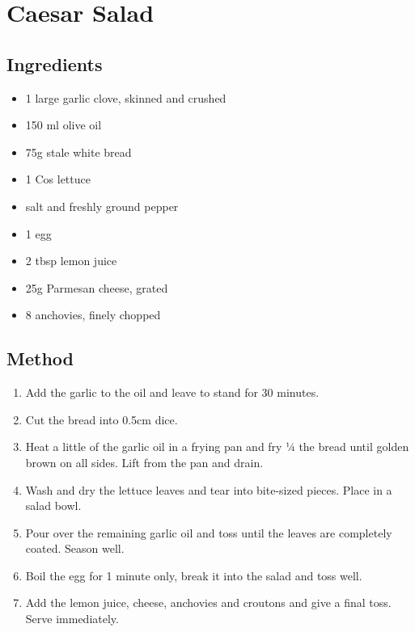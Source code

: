 \section{Caesar Salad}

  
\subsection{Ingredients}

\begin{itemize}
	\item 1 large garlic clove, skinned and crushed
	\item 150 ml olive oil
	\item 75g stale white bread
	\item 1 Cos lettuce
	\item salt and freshly ground pepper
	\item 1 egg
	\item 2 tbsp lemon juice
	\item 25g Parmesan cheese, grated
	\item 8 anchovies, finely chopped
\end{itemize}

\subsection{Method}

\begin{enumerate}
	\item Add the garlic to the oil and leave to stand for 30 minutes.
	\item Cut the bread into 0.5cm dice.
	\item Heat a little of the garlic oil in a frying pan and fry ¼ the bread until golden brown on all sides. Lift from the pan and drain.
	\item Wash and dry the lettuce leaves and tear into bite-sized pieces. Place in a salad bowl.
	\item Pour over the remaining garlic oil and toss until the leaves are completely coated. Season well.
	\item Boil the egg for 1 minute only, break it into the salad and toss well.
	\item Add the lemon juice, cheese, anchovies and croutons and give a final toss. Serve immediately.
\end{enumerate}
